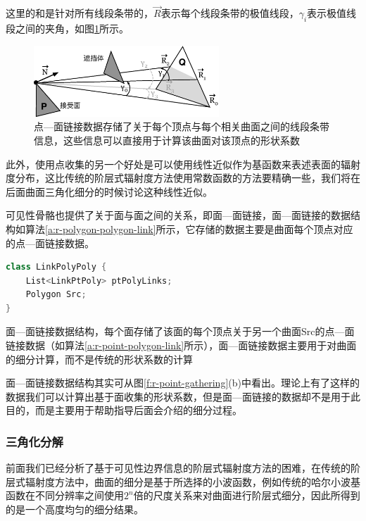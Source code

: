 \noindent 这里的和是针对所有线段条带的，$\vec{R}$表示每个线段条带的极值线段，$\gamma_i$表示极值线段之间的夹角，如图\ref{f:r-point-polygon-link}所示。

\begin{figure}
	\sidecaption
	\includegraphics[width=0.62\textwidth]{figures/r/point-polygon-link}
	\caption{点—面链接数据存储了关于每个顶点与每个相关曲面之间的线段条带信息，这些信息可以直接用于计算该曲面对该顶点的形状系数}
	\label{f:r-point-polygon-link}
\end{figure}

此外，使用点收集的另一个好处是可以使用线性近似作为基函数来表述表面的辐射度分布，这比传统的阶层式辐射度方法使用常数函数的方法要精确一些，我们将在后面曲面三角化细分的时候讨论这种线性近似。

可见性骨骼也提供了关于面与面之间的关系，即面—面链接，面—面链接的数据结构如算法\ref{a:r-polygon-polygon-link}所示，它存储的数据主要是曲面每个顶点对应的点—面链接数据。

\begin{algorithm}
\begin{lstlisting}[language=C++, mathescape]
class LinkPolyPoly {
	List<LinkPtPoly> ptPolyLinks;
	Polygon Src;
}
\end{lstlisting}
\caption{面—面链接数据结构，每个面存储了该面的每个顶点关于另一个曲面Src的点—面链接数据（如算法\ref{a:r-point-polygon-link}所示），面—面链接数据主要用于对曲面的细分计算，而不是传统的形状系数的计算}
\label{a:r-polygon-polygon-link}
\end{algorithm}

面—面链接数据结构其实可从图\ref{f:r-point-gathering}(b)中看出。理论上有了这样的数据我们可以计算出基于面收集的形状系数，但是面—面链接的数据却不是用于此目的，而是主要用于帮助指导后面会介绍的细分过程。




\subsubsection{三角化分解}\label{sec:rad-triangulation}
前面我们已经分析了基于可见性边界信息的阶层式辐射度方法的困难，在传统的阶层式辐射度方法中，曲面的细分是基于所选择的小波函数，例如传统的哈尔小波基函数在不同分辨率之间使用$2^{n}$倍的尺度关系来对曲面进行阶层式细分，因此所得到的是一个高度均匀的细分结果。

